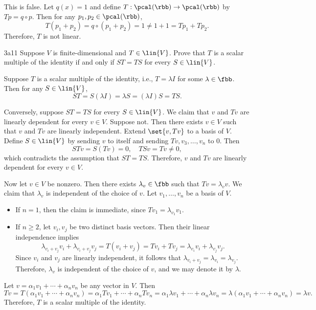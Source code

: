 \begin{sol}
    This is false.
	Let $q(x) = 1$ and define $T: \pcal(\rbb) \to \pcal(\rbb)$ by $Tp = q \circ p$.
	Then for any $p_1, p_2 \in \pcal(\rbb)$,
    \[
    	T(p_1 + p_2) = q \circ (p_1 + p_2) = 1 \neq 1 + 1 = Tp_1 + Tp_2.
    \]
	Therefore, $T$ is not linear.
\end{sol}

\begin{exercise}{3a11}
    Suppose $V$ is finite-dimensional and $T \in \lin{V}$.
	Prove that $T$ is a scalar multiple of the identity if and only if $ST = TS$ for every $S \in \lin{V}$.
\end{exercise}

\begin{sol}
    Suppose $T$ is a scalar multiple of the identity, i.e., $T = \lambda I$ for some $\lambda \in \fbb$.
	Then for any $S \in \lin{V}$,
    \[
    	ST = S(\lambda I) = \lambda S = (\lambda I)S = TS.
    \]

    Conversely, suppose $ST = TS$ for every $S \in \lin{V}$.
	We claim that $v$ and $Tv$ are linearly dependent for every $v \in V$.
	Suppose not.
	Then there exists $v \in V$ such that $v$ and $Tv$ are linearly independent.
	Extend $\set{v, Tv}$ to a basis of $V$.
	Define $S \in \lin{V}$ by sending $v$ to itself and sending $Tv, v_3, \ldots, v_n$ to $0$.
	Then
    \[
    	STv = S(Tv) = 0, \quad TSv = Tv \neq 0,
    \]
    which contradicts the assumption that $ST = TS$.
	Therefore, $v$ and $Tv$ are linearly dependent for every $v \in V$.

    Now let $v \in V$ be nonzero.
	Then there exists $\lambda_v \in \fbb$ such that $Tv = \lambda_v v$.
	We claim that $\lambda_v$ is independent of the choice of $v$.
	Let $v_1, \ldots, v_n$ be a basis of $V$.
    \begin{itemize}
        \item If $n = 1$, then the claim is immediate, since $Tv_1 = \lambda_{v_1} v_1$.
        \item If $n \geq 2$, let $v_i, v_j$ be two distinct basis vectors.
	Then their linear independence implies
        \[
        	\lambda_{v_i + v_j} v_i + \lambda_{v_i + v_j} v_j = T(v_i + v_j) = Tv_i + Tv_j = \lambda_{v_i} v_i + \lambda_{v_j} v_j.
        \]
        Since $v_i$ and $v_j$ are linearly independent, it follows that $\lambda_{v_i + v_j} = \lambda_{v_i} = \lambda_{v_j}$.
	Therefore, $\lambda_v$ is independent of the choice of $v$, and we may denote it by $\lambda$.
    \end{itemize}
    Let $v = \alpha_1 v_1 + \cdots + \alpha_n v_n$ be any vector in $V$.
	Then
    \[
    	Tv = T(\alpha_1 v_1 + \cdots + \alpha_n v_n) = \alpha_1 Tv_1 + \cdots + \alpha_n Tv_n = \alpha_1 \lambda v_1 + \cdots + \alpha_n \lambda v_n = \lambda (\alpha_1 v_1 + \cdots + \alpha_n v_n) = \lambda v.
    \]
    Therefore, $T$ is a scalar multiple of the identity.
\end{sol}

